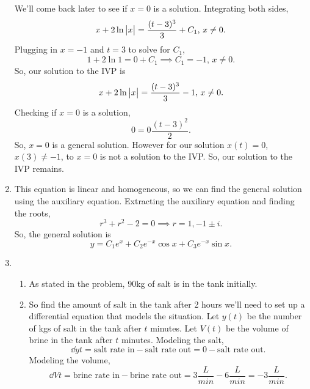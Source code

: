 \begin{enumerate}[label=\arabic*.]
\begin{equation*}
		\end{equation*}
		We'll come back later to see if $x = 0$ is a solution.
		Integrating both sides,
		\begin{equation*}
			x + 2\ln{\big\lvert x \big\rvert} = \frac{(t-3)^3}{3} + C_1 \text{, } x\neq 0.
		\end{equation*}
		Plugging in $x = -1$ and $t = 3$ to solve for $C_1$,
		\begin{equation*}
			1 + 2\ln{1} = 0 + C_1 \implies C_1 = -1 \text{, } x\neq 0.
		\end{equation*}
		So, our solution to the IVP is
		\begin{equation*}
			x + 2\ln{\big\lvert x \big\rvert} = \frac{(t-3)^3}{3} - 1 \text{, } x\neq 0.
		\end{equation*}
		Checking if $x = 0$ is a solution,
		\begin{equation*}
			0 = 0\frac{(t-3)^2}{2}.
		\end{equation*}
		So, $x = 0$ is a general solution.
		However for our solution $x(t) = 0$, $x(3) \neq -1$, to $x = 0$ is not a solution to the IVP.
		So, our solution to the IVP remains.
	\item
		This equation is linear and homogeneous, so we can find the general solution using the auxiliary equation. Extracting the auxiliary equation and finding the roots,
		\begin{equation*}
			r^3 + r^2 - 2 = 0 \implies r = 1, -1 \pm i.
		\end{equation*}
		So, the general solution is
		\begin{equation*}
			y = C_1e^{x} + C_2e^{-x}\cos{x} + C_3e^{-x}\sin{x}.
		\end{equation*}
	\item
		\begin{enumerate}[label=(\alph*)]
			\item
				As stated in the problem, 90kg of salt is in the tank initially.
			\item
				So find the amount of salt in the tank after 2 hours we'll need to set up a differential equation that models the situation.
				Let $y(t)$ be the number of kgs of salt in the tank after $t$ minutes. Let $V(t)$ be the volume of brine in the tank after $t$ minutes.
				Modeling the salt,
				\begin{equation*}
					\dd{y}{t} = \text{salt rate in} - \text{salt rate out} = 0 - \text{salt rate out}.
				\end{equation*}
				Modeling the volume,
				\begin{equation*}
					\dd{V}{t} = \text{brine rate in} - \text{brine rate out} = 3\frac{L}{min} - 6\frac{L}{min} = -3\frac{L}{min}.

\end{equation*}
\end{enumerate}
\end{enumerate}
